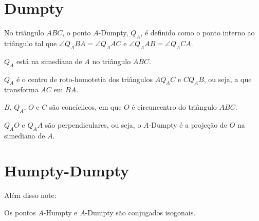 \documentclass[10pt, a4paper]{article}
\begin{document}
	\section{Dumpty}
	\begin{defn}
		No triângulo $ABC$, o ponto $A$-Dumpty, $Q_A$, é definido como o ponto interno ao triângulo tal que $\angle Q_ABA = \angle Q_AAC$ e $\angle Q_AAB = \angle Q_ACA$.
	\end{defn}
	\begin{figure}[h]
		\centering
		\def\svgwidth{0.25\columnwidth}
		
	\end{figure}
	\begin{prop}
		$Q_A$ está na simediana de $A$ no triângulo $ABC$.
	\end{prop}
	\begin{prop}
		$Q_A$ é o centro de roto-homotetia dos triângulos $AQ_AC$ e $CQ_AB$, ou seja, a que transforma $AC$ em $BA$.
	\end{prop}
	\begin{prop}
		$B$, $Q_A$, $O$ e $C$ são concíclicos, em que $O$ é circuncentro do triângulo $ABC$.
	\end{prop}
	\begin{prop}
		$Q_AO$ e $Q_AA$ são perpendiculares, ou seja, o $A$-Dumpty é a projeção de $O$ na simediana de $A$.
	\end{prop}
	
	\section{Humpty-Dumpty}
	
	Além disso note:
	\begin{prop}
		Os pontos $A$-Humpty e $A$-Dumpty são conjugados isogonais.
	\end{prop}
\end{document}
